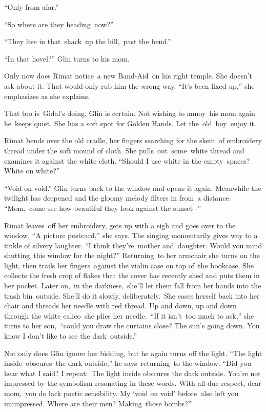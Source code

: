 \documentclass[twoside,11pt]{book}
\begin{document}
{}``Only from afar.''

{}``So where are they heading~now?''

{{}``They live in that\ shack\ up the
hill,\ }past{ the bend.''}

{{}``In that hovel?'' Glin turns }to his
mom{.}

{Only now does Rimat notice~a new
B}and-Aid\ {on his right temple. She doesn't ask about it. T}hat would
only rub him the wrong way{. ``It's been fixed up,{}'' she emphasizes
as she explains. }\ 

{That too is\ Gidal's doing, Glin is certain. Not wishing to annoy\ his
}mom{ again he\ keeps quiet. She has a soft spot for Golden Hands. Let
the\ }old\ boy\ {enjoy it.}\ 

{Rimat bends over the old cradle, her fingers searching for the
}skein\ {of embroidery thread under the soft mound of cloth. She
pulls\ }out\ some\ {white thread and examines it against the white
cloth. ``Should I use white in the }empty{\ spaces? White on white?''}

{{}``Void on void.{}'' Glin
}turns{ back to the window and opens it again. Meanwhile the twilight
has deepened and the gloomy melody filters in from~a distance. ``Mom,\ come see how beautiful they look against the
sunset -{}''}\ 

{Rimat leaves\ off her embroidery, gets up with a sigh and goes over to
the window. ``A picture postcard,'' she says. The singing momentarily gives way to a tinkle of silvery laughter. ``I
think they're~mother and~daughter}. Would you mind shutting\ this window for the
night?{{}''
}Returning{\ }{to her armchair
she turns on the light, }then trails her fingers\ {against the violin
case on }top of{\ }{the
bookcase. She collects the fresh crop of flakes that the cover has recently shed and
}puts{ them in her pocket. Later on},~in the
darkness,\ {she'll let them fall from her hands into the trash
bin\ }outside{. She'll do it slowly, deliberately.~She eases herself
back into her chair and threads her needle with red thread. Up and down, up and down }through the white calico\ she
{plies her needle.\  ``If it
isn't}{\ }{too much to
ask,'' she }turns to her son,\ {``could you
}draw the curtains close? The sun's going down.{ You know I don't like
to see the dark}\ {outside.''\ }

{Not only does Glin
}ignore{ her bidding, but he again turns off the light. ``The light
inside~o}bscures\ {the dark outside,{}'' he says\ returning\ to the
window. ``Did you hear what I said? I
repeat}{:}{\ The light inside
}obscures{ the dark outside. You're not impressed by the symbolism
resonating in these words. With all due respect, }dear mom,\ {you do
lack poetic sensibility. My `void on void' }before\ also left you
unimpressed.{ Where are their men?
}Making{~those bombs?''}
\end{document}
